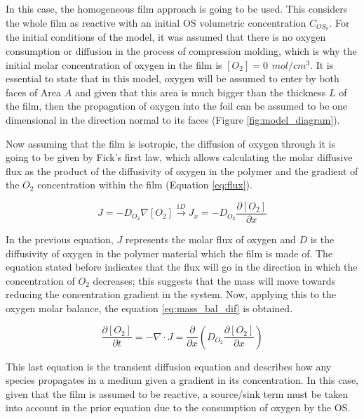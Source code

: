 \begin{refsection}
In this case, the homogeneous film approach is going to be used. This considers the whole film as reactive with an initial OS volumetric concentration $C_{OS_0}$. For the initial conditions of the model, it was assumed that there is no oxygen consumption or diffusion in the process of compression molding, which is why the initial molar concentration of oxygen in the film is $[O_2]=0 \hspace{5pt} mol/cm^3$.  It is essential to state that in this model, oxygen will be assumed to enter by both faces of Area $A$ and given that this area is much bigger than the thickness $L$ of the film, then the propagation of oxygen into the foil can be assumed to be one dimensional in the direction normal to its faces (Figure \ref{fig:model_diagram}).

Now assuming that the film is isotropic, the diffusion of oxygen through it is going to be given by Fick's first law, which allows calculating the molar diffusive flux as the product of the diffusivity of oxygen in the polymer and the gradient of the $O_2$ concentration within the film (Equation \ref{eq:flux}).

\begin{equation}
    J=-D_{O_2}\nabla [O_2] \xrightarrow{1D}J_x=-D_{O_2}\frac{\partial [O_2]}{\partial x}
    \label{eq:flux}
\end{equation}

In the previous equation, $J$ represents the molar flux of oxygen and $D$ is the diffusivity of oxygen in the polymer material which the film is made of. The equation stated before indicates that the flux will go in the direction in which the concentration of $O_2$ decreases; this suggests that the mass will move towards reducing the concentration gradient in the system. Now, applying this to the oxygen molar balance, the equation \ref{eq:mass_bal_dif} is obtained. 

\begin{equation}
    \frac{\partial [O_2]}{\partial t}= -\nabla \cdot J= \frac{\partial}{\partial x} \left(D_{O_2}\frac{\partial [O_2] }{\partial x}\right)
    \label{eq:mass_bal_dif}
\end{equation}

This last equation is the transient diffusion equation and describes how any species propagates in a medium given a gradient in its concentration. In this case, given that the film is assumed to be reactive, a source/sink term must be taken into account in the prior equation due to the consumption of oxygen by the OS.


\end{refsection}
